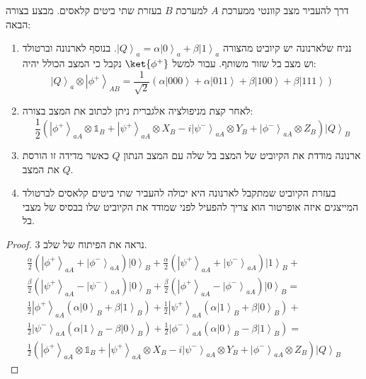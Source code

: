 \documentclass{tstextbook}
\begin{document}
\begin{proposition}
דרך להעביר מצב קוונטי ממערכת \(A\) למערכת \(B\) בעזרת שתי ביטים קלאסים. מבצע בצורה הבאה:

  \begin{enumerate}
    \item נניח שלארנונה יש קיוביט מהצורה \(\left|Q\right\rangle_{a}=\alpha\left|0\right\rangle_{a}+\beta\left|1\right\rangle_{a}\). בנוסף לארנונה וברטולד וש מצב בל שזור משותף. עבור למשל \(\ket{\phi^{+}}\) נקבל כי המצב הכולל יהיה: 
$$\left|Q\right\rangle_{a}\otimes\left|\phi^{+}\right\rangle_{A B}=\frac{1}{\sqrt{2}}\left(\alpha\left|000\right\rangle+\alpha\left|011\right\rangle+\beta\left|100\right\rangle+\beta\left|111\right\rangle\right)$$


    \item לאחר קצת מניפולציה אלגברית ניתן לכתוב את המצב בצורה: 
$$\frac{1}{2}\left(\left|\phi^{+}\right\rangle_{a A}\otimes\mathbb{1}_{B}+\left|\psi^{+}\right\rangle_{a A}\otimes X_{B}-i\left|\psi^{-}\right\rangle_{a A}\otimes Y_{B}+\left|\phi^{-}\right\rangle_{a A}\otimes Z_{B}\right)\left|Q\right\rangle_{B}$$


    \item ארנונה מודדת את הקיוביט של המצב בל שלה עם המצב הנתון \(Q\) כאשר מדידה זו הורסת את המצב \(Q\). 


    \item בעזרת הקיוביט שמתקבל לארנונה היא יכולה להעביר שתי ביטים קלאסים לברטולד המייצגים איזה אופרטור הוא צריך להפעיל לפני שמודד את הקיוביט שלו בבסיס של מצבי בל. 


  \end{enumerate}
\end{proposition}
\begin{proof}
נראה את הפיתוח של שלב 3.
$$\begin{gather} \frac{\alpha}{2}\left(\left|\phi^{+}\right\rangle_{aA}+\left|\phi^{-}\right\rangle_{aA}\right)\left|0\right\rangle_{B}+\frac{\alpha}{2}\left(\left|\psi^{+}\right\rangle_{aA}+\left|\psi^{-}\right\rangle_{aA}\right)\left|1\right\rangle_{B}+\\ \frac{\beta}{2}\left(\left|\psi^+\right\rangle_{aA}-\left|\psi^-\right\rangle_{aA}\right)\left|0\right\rangle_B+\frac{\beta}{2}\left(\left|\phi^+\right\rangle_{aA}-\left|\phi^-\right\rangle_{aA}\right)\left|0\right\rangle_B=\\ \frac{1}{2}\left|\phi^{+}\right\rangle_{aA}\left( \alpha\left|0\right\rangle_{B}+\beta\left|1\right\rangle_{B} \right)+\frac{1}{2}\left|\psi^{+}\right\rangle_{aA}\left( \alpha\left|1\right\rangle_{B}+\beta\left|0\right\rangle_{B} \right)+\\ \frac{1}{2}\left|\psi^{-}\right\rangle_{aA}\left( \alpha\left|1\right\rangle_{B}-\beta\left|0\right\rangle_{B} \right)+\frac{1}{2}\left|\phi^{-}\right\rangle_{aA}\left( \alpha\left|0\right\rangle_{B}-\beta\left|1\right\rangle_{B} \right)=\\ \frac{1}{2}\left(\left|\phi^{+}\right\rangle_{aA}\otimes\mathbb{1}_{B}+\left|\psi^{+}\right\rangle_{aA}\otimes X_{B}-i\left|\psi^{-}\right\rangle_{aA}\otimes Y_{B}+\left|\phi^{-}\right\rangle_{aA}\otimes Z_{B}\right)\left|Q\right\rangle_{B}  
\end{gather}$$

\end{proof}
\end{document}
